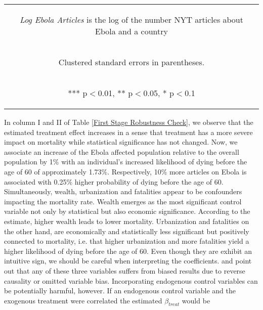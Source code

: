 \documentclass{article}
\begin{document}
\begin{table}[htbp]
{\begin{tabular}{lcccccc}
\multicolumn{7}{c}{\begin{footnotesize} \textit{Log Ebola Articles} is the log of the number NYT articles about Ebola and a country \end{footnotesize} }\\
\multicolumn{7}{c}{\begin{footnotesize} Clustered standard errors in parentheses. \end{footnotesize} }\\
\multicolumn{7}{c}{\begin{footnotesize} *** p$<$0.01, ** p$<$0.05, * p$<$0.1\end{footnotesize}} \\
\end{tabular}
}
\end{table}

In column I and II of Table \ref{First Stage Robustness Check}, we observe that the estimated treatment effect increases in a sense that treatment has a more severe impact on mortality while statistical significance has not changed. Now, we associate an increase of the Ebola affected population relative to the overall population by 1\% with an individual's increased likelihood of dying before the age of 60 of approximately 1.73\%. Respectively, 10\% more articles on Ebola is associated with 0.25\% higher probability of dying before the age of 60.
Simultaneously, wealth, urbanization and fatalities appear to be confounders impacting the mortality rate. Wealth emerges as the most significant control variable not only by statistical but also economic significance. According to the estimate, higher wealth leads to lower mortality. Urbanization and fatalities on the other hand, are economically and statistically less significant but positively connected to mortality, i.e. that higher urbanization and more fatalities yield a higher likelihood of dying before the age of 60. Even though they are exhibit an intuitive sign, we should be careful when interpreting the coefficients. \cite{cutler2006determinants} and \cite{gonzalez2017epidemics} point out that any of these three variables suffers from biased results due to reverse causality or omitted variable bias. Incorporating endogenous control variables can be potentially harmful, however. If an endogenous control variable and the exogenous treatment were correlated the estimated $\beta_{treat}$ would be 
\end{document}
